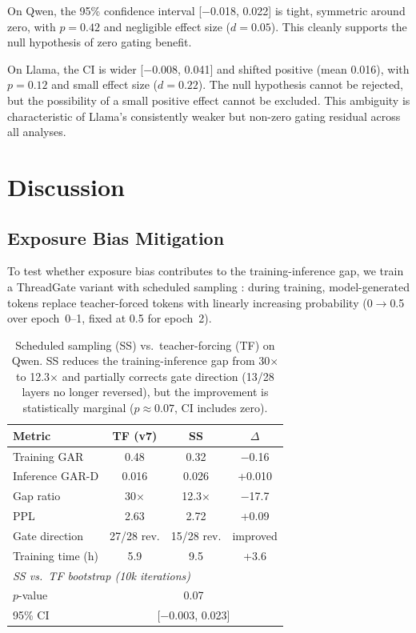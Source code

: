 \documentclass[11pt]{article}
\begin{document}
On Qwen, the 95\% confidence interval [$-$0.018, 0.022] is tight, symmetric around zero, with $p{=}0.42$ and negligible effect size ($d{=}0.05$).
This cleanly supports the null hypothesis of zero gating benefit.

On Llama, the CI is wider [$-$0.008, 0.041] and shifted positive (mean 0.016), with $p{=}0.12$ and small effect size ($d{=}0.22$).
The null hypothesis cannot be rejected, but the possibility of a small positive effect cannot be excluded.
This ambiguity is characteristic of Llama's consistently weaker but non-zero gating residual across all analyses.

\section{Discussion}
\label{sec:discussion}

\subsection{Exposure Bias Mitigation}

To test whether exposure bias contributes to the training-inference gap, we train a ThreadGate variant with scheduled sampling \cite{bengio2015scheduled}: during training, model-generated tokens replace teacher-forced tokens with linearly increasing probability (0$\to$0.5 over epoch~0--1, fixed at 0.5 for epoch~2).

\begin{table}[t]
\centering
\small
\begin{tabular}{lccc}
\toprule
\textbf{Metric} & \textbf{TF (v7)} & \textbf{SS} & \textbf{$\Delta$} \\
\midrule
Training GAR         & 0.48  & 0.32  & $-$0.16 \\
Inference GAR-D      & 0.016 & 0.026 & +0.010 \\
Gap ratio            & 30$\times$  & 12.3$\times$ & $-$17.7 \\
PPL                  & 2.63  & 2.72  & +0.09 \\
Gate direction       & 27/28 rev.  & 15/28 rev. & improved \\
Training time (h)    & 5.9   & 9.5   & +3.6 \\
\midrule
\multicolumn{4}{l}{\emph{SS vs.\ TF bootstrap (10k iterations)}} \\
$p$-value            & \multicolumn{3}{c}{0.07} \\
95\% CI              & \multicolumn{3}{c}{[$-$0.003, 0.023]} \\
\bottomrule
\end{tabular}
\caption{Scheduled sampling (SS) vs.\ teacher-forcing (TF) on Qwen. SS reduces the training-inference gap from 30$\times$ to 12.3$\times$ and partially corrects gate direction (13/28 layers no longer reversed), but the improvement is statistically marginal ($p{\approx}0.07$, CI includes zero).}
\label{tab:mitigation}
\end{table}
\end{document}

